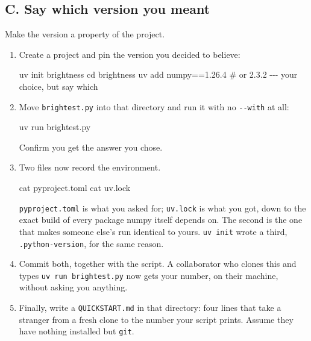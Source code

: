 \documentclass[
  letterpaper,
  DIV=11,
  numbers=noendperiod]{scrartcl}
\newenvironment{Shaded}{\begin{snugshade}}{\end{snugshade}}
\newcommand{\BuiltInTok}[1]{\textcolor[rgb]{0.00,0.23,0.31}{#1}}
\newcommand{\CommentTok}[1]{\textcolor[rgb]{0.37,0.37,0.37}{#1}}
\newcommand{\ExtensionTok}[1]{\textcolor[rgb]{0.00,0.23,0.31}{#1}}
\newcommand{\FunctionTok}[1]{\textcolor[rgb]{0.28,0.35,0.67}{#1}}
\newcommand{\NormalTok}[1]{\textcolor[rgb]{0.00,0.23,0.31}{#1}}
\newcommand{\StringTok}[1]{\textcolor[rgb]{0.13,0.47,0.30}{#1}}
\begin{document}
\subsection{C. Say which version you
meant}\label{c.-say-which-version-you-meant}

Make the version a property of the project.

\begin{enumerate}
\def\labelenumi{\roman{enumi}.}
\item
  Create a project and pin the version you decided to believe:

\begin{Shaded}
\begin{Highlighting}[]
\ExtensionTok{uv}\NormalTok{ init brightness}
\BuiltInTok{cd}\NormalTok{ brightness}
\ExtensionTok{uv}\NormalTok{ add }\StringTok{\textquotesingle{}numpy==1.26.4\textquotesingle{}}      \CommentTok{\# or 2.3.2 {-}{-}{-} your choice, but say which}
\end{Highlighting}
\end{Shaded}
\item
  Move \texttt{brightest.py} into that directory and run it with no
  \texttt{-\/-with} at all:

\begin{Shaded}
\begin{Highlighting}[]
\ExtensionTok{uv}\NormalTok{ run brightest.py}
\end{Highlighting}
\end{Shaded}

  Confirm you get the answer you chose.
\item
  Two files now record the environment.

\begin{Shaded}
\begin{Highlighting}[]
\FunctionTok{cat}\NormalTok{ pyproject.toml}
\FunctionTok{cat}\NormalTok{ uv.lock}
\end{Highlighting}
\end{Shaded}

  \texttt{pyproject.toml} is what you asked for; \texttt{uv.lock} is
  what you got, down to the exact build of every package numpy itself
  depends on. The second is the one that makes someone else's run
  identical to yours. \texttt{uv\ init} wrote a third,
  \texttt{.python-version}, for the same reason.
\item
  Commit both, together with the script. A collaborator who clones this
  and types \texttt{uv\ run\ brightest.py} now gets your number, on
  their machine, without asking you anything.
\item
  Finally, write a \texttt{QUICKSTART.md} in that directory: four lines
  that take a stranger from a fresh clone to the number your script
  prints. Assume they have nothing installed but \texttt{git}.
\end{enumerate}
\end{document}
